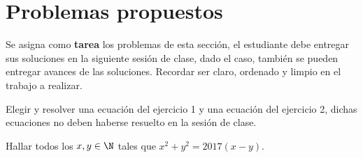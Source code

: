 \section{Problemas propuestos}

Se asigna como \textbf{tarea} los problemas de esta sección, el estudiante debe entregar sus soluciones en la siguiente
sesión de clase, dado el caso, también se pueden entregar avances de las soluciones.
Recordar ser claro, ordenado y limpio en el trabajo a realizar.

\begin{exercise}
    Elegir y resolver una ecuación del ejercicio 1 y una ecuación del ejercicio 2,
    dichas ecuaciones no deben haberse resuelto en la sesión de clase.
\end{exercise}

\begin{problem}
    Hallar todos los $x,y \in \N$ tales que $x^2 + y^2 = 2017(x - y)$.
\end{problem}